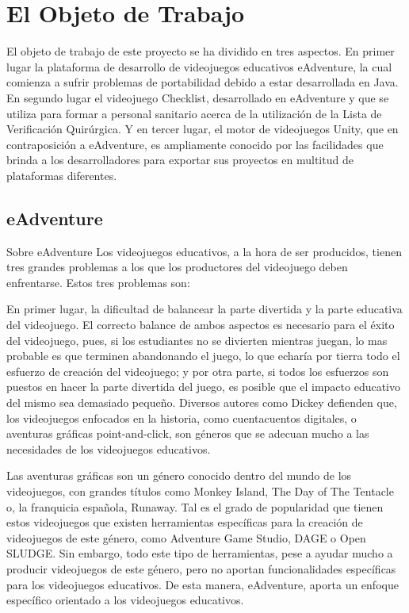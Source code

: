 \section{El Objeto de Trabajo}
\label{objetodetrabajo}

El objeto de trabajo de este proyecto se ha dividido en tres aspectos. En primer lugar la plataforma de desarrollo de videojuegos educativos eAdventure, la cual comienza a sufrir problemas de portabilidad debido a estar desarrollada en Java. En segundo lugar el videojuego Checklist, desarrollado en eAdventure y que se utiliza para formar a personal sanitario acerca de la utilización de la Lista de Verificación Quirúrgica. Y en tercer lugar, el motor de videojuegos Unity, que en contraposición a eAdventure, es ampliamente conocido por las facilidades que brinda a los desarrolladores para exportar sus proyectos en multitud de plataformas diferentes.

\subsection{eAdventure}
\label{eadventure}

Sobre eAdventure Los videojuegos educativos, a la hora de ser producidos, tienen tres grandes problemas a los que los productores del videojuego deben enfrentarse. Estos tres problemas son: 

En primer lugar, la dificultad de balancear la parte divertida y la parte educativa del videojuego. El correcto balance de ambos aspectos es necesario para el éxito del videojuego, pues, si los estudiantes no se divierten mientras juegan, lo mas probable es que terminen abandonando el juego, lo que echaría por tierra todo el esfuerzo de creación del videojuego; y por otra parte, si todos los esfuerzos son puestos en hacer la parte divertida del juego, es posible que el impacto educativo del mismo sea demasiado pequeño. Diversos autores como Dickey defienden que, los videojuegos enfocados en la historia, como cuentacuentos digitales, o aventuras gráficas point-and-click, son géneros que se adecuan mucho a las necesidades de los videojuegos educativos.

Las aventuras gráficas son un género conocido dentro del mundo de los videojuegos, con grandes títulos como Monkey Island, The Day of The Tentacle o, la franquicia española, Runaway. Tal es el grado de popularidad que tienen estos videojuegos que existen herramientas específicas para la creación de videojuegos de este género, como Adventure Game Studio, DAGE o Open SLUDGE. Sin embargo, todo este tipo de herramientas, pese a ayudar mucho a producir videojuegos de este género, pero no aportan funcionalidades específicas para los videojuegos educativos. De esta manera, eAdventure, aporta un enfoque específico orientado a los videojuegos educativos. 


